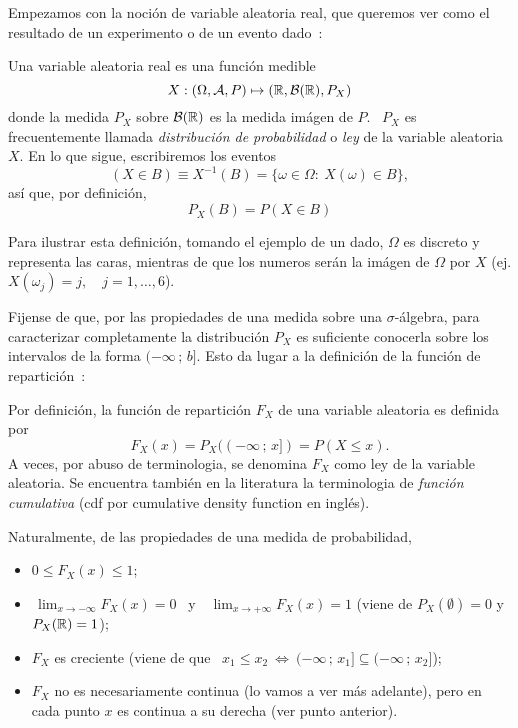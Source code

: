 Empezamos con la  noci\'on de variable aleatoria real, que  queremos ver como el
resultado de un experimento o de un evento dado~\cite{AthLah06, Coh13, Bre88}:
%
\begin{definicion}
\label{Def:MP:VariableAleatotiaReal}
%
  Una variable aleatoria real es una funci\'on medible
  \[
  X: (\Omega,\mathcal{A},P) \mapsto (\mathbb{R},\mathcal{B}(\mathbb{R}),P_X)
  \]
  donde la medida  $P_X$ sobre $\mathcal{B}(\mathbb{R})$ es la medida im\'agen  de $P$.  \ $P_X$
  es frecuentemente llamada {\it distribuci\'on  de probabilidad} o {\it ley} de
  la variable aleatoria $X$. En lo que sigue, escribiremos los eventos
  \[
  (X \in B) \equiv X^{-1}(B) = \{ \omega \in \Omega: \: X(\omega) \in B \},
  \]
  as\'i que, por definici\'on,
  \[
  P_X(B) = P(X \in B)
  \]
\end{definicion}
%
Para  ilustrar esta definici\'on,  tomando el  ejemplo de  un dado,  $\Omega$ es
discreto y representa  las caras, mientras de que los  numeros ser\'an la im\'agen
de $\Omega$ por $X$ (ej. $X(\omega_j) = j, \quad j = 1, \ldots , 6$).

Fijense de que, por las  propiedades de una medida sobre una $\sigma$-\'algebra,
para caracterizar completamente la  distribuci\'on $P_X$ es suficiente conocerla
sobre  los intervalos de  la forma  $(-\infty \,  ; \,  b]$. Esto  da lugar  a la
definici\'on  de  la funci\'on  de  repartici\'on~\cite{AthLah06, Coh13,  Bre88,
  HogMck13}:
%
\begin{definicion}
\label{Def:MP:FuncionReparticion}
%
  Por  definici\'on,  la  funci\'on  de  repartici\'on  $F_X$  de  una  variable
  aleatoria es definida por
  \[
  F_X(x) = P_X((-\infty \, ; \, x]) = P(X \le x).
  \]
  A veces, por abuso de terminologia,  se denomina $F_X$ como ley de la variable
  aleatoria. Se  encuentra tambi\'en  en la literatura  la terminologia  de {\it
    funci\'on cumulativa} (cdf por cumulative density function en ingl\'es).
\end{definicion}
%
Naturalmente, de las propiedades de una medida de probabilidad,
%
\begin{itemize}
\item $0 \le F_X(x) \le 1$;
%
\item $\displaystyle \, \lim_{x \to -\infty} F_X(x) = 0$ \ y \ $\displaystyle \,
  \lim_{x \to +\infty} F_X(x) = 1$  (viene de $P_X(\emptyset) = 0$ y $P_X(\mathbb{R})
  = 1$);
%
\item  $F_X$ es creciente  \big(viene de  que \  $x_1 \le  x_2 \:  \Leftrightarrow \:
  (-\infty \, ; \, x_1] \subseteq (-\infty \, ; \, x_2]$\big);
%
\item $F_X$ no es necesariamente continua  (lo vamos a ver m\'as adelante), pero
  en cada punto $x$ es continua a su derecha (ver punto anterior).
\end{itemize}


